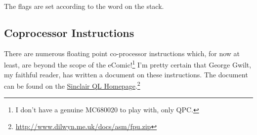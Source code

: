 The flags are set according to the word on the stack.

\subsection{Coprocessor Instructions}

There are numerous floating point co-processor instructions which, for now at least, are beyond the scope of the eComic!\footnote{I don't have a genuine MC680020 to play with, only QPC.} I'm pretty certain that George Gwilt, my faithful reader, has written a document on these instructions. The document can be found on the \href{http://www.dilwyn.me.uk/docs/asm/fpu.zip}{Sinclair QL Homepage}.\footnote{\url{http://www.dilwyn.me.uk/docs/asm/fpu.zip}}